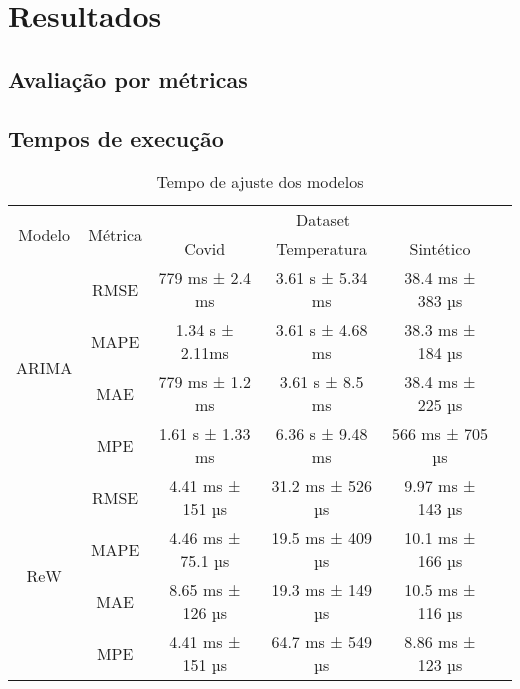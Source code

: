 \section{Resultados}

\subsection{Avaliação por métricas}

\subsection{Tempos de execução}

\begin{table}[!htp]\centering
    \caption{Tempo de ajuste dos modelos}
    \begin{tabular}{cccccc}
        \toprule
        \multirow{2}{*}{Modelo}  & \multirow{2}{*}{Métrica} & \multicolumn{3}{c}{Dataset}                                       \\\cmidrule{3-5}
                                 &                          & Covid                       & Temperatura      & Sintético        \\\midrule
        \multirow{4}{*}{ARIMA}   & RMSE                     & 779 ms ± 2.4 ms             & 3.61 s ± 5.34 ms & 38.4 ms ± 383 µs \\
                                 & MAPE                     & 1.34 s ± 2.11ms             & 3.61 s ± 4.68 ms & 38.3 ms ± 184 µs \\
                                 & MAE                      & 779 ms ± 1.2 ms             & 3.61 s ± 8.5 ms  & 38.4 ms ± 225 µs \\
                                 & MPE                      & 1.61 s ± 1.33 ms            & 6.36 s ± 9.48 ms & 566 ms ± 705 µs  \\\midrule
        \multirow{4}{*}{ReW}     & RMSE                     & 4.41 ms ± 151 µs            & 31.2 ms ± 526 µs & 9.97 ms ± 143 µs \\
                                 & MAPE                     & 4.46 ms ± 75.1 µs           & 19.5 ms ± 409 µs & 10.1 ms ± 166 µs \\
                                 & MAE                      & 8.65 ms ± 126 µs            & 19.3 ms ± 149 µs & 10.5 ms ± 116 µs \\
                                 & MPE                      & 4.41 ms ± 151 µs            & 64.7 ms ± 549 µs & 8.86 ms ± 123 µs \\\midrule

\end{tabular}
\end{table}
